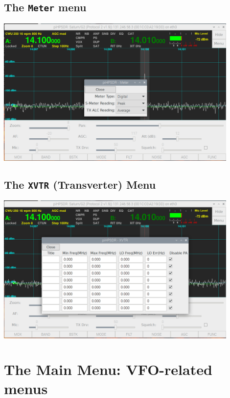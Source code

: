 \documentclass[12pt]{book}
\begin{document}
\section{The \texttt{Meter} menu}
\begin{center}
\includegraphics[width=12cm]{MeterMenu.png}
\end{center}

\section{The \texttt{XVTR} (Transverter) Menu}
\begin{center}
\includegraphics[width=12cm]{XVTRMenu.png}
\end{center}

\chapter{The Main Menu: VFO-related menus}
\end{document}
